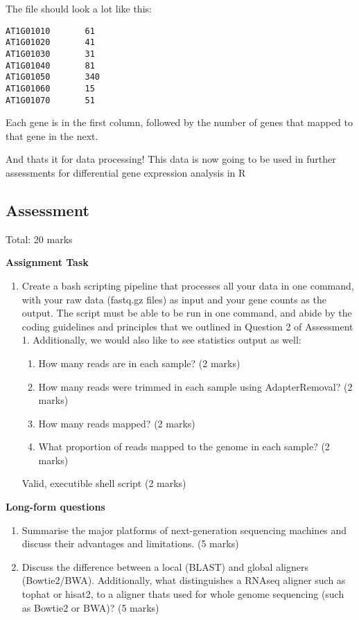 The file should look a lot like this:

\begin{verbatim}
AT1G01010       61
AT1G01020       41
AT1G01030       31
AT1G01040       81
AT1G01050       340
AT1G01060       15
AT1G01070       51
\end{verbatim}

Each gene is in the first column, followed by the number of genes that
mapped to that gene in the next.

And thats it for data processing! This data is now going to be used in
further assessments for differential gene expression analysis in R

\subsection{Assessment}\label{assessment}

Total: 20 marks

\textbf{Assignment Task}

\begin{enumerate}
\def\labelenumi{\arabic{enumi}.}
\item
  Create a bash scripting pipeline that processes all your data in one
  command, with your raw data (fastq.gz files) as input and your gene
  counts as the output. The script must be able to be run in one
  command, and abide by the coding guidelines and principles that we
  outlined in Question 2 of Assessment 1. Additionally, we would also
  like to see statistics output as well:

  \begin{enumerate}
  \def\labelenumii{(\Alph{enumii})}
  \tightlist
  \item
    How many reads are in each sample? (2 marks)\\
  \item
    How many reads were trimmed in each sample using AdapterRemoval? (2
    marks)\\
  \item
    How many reads mapped? (2 marks)\\
  \item
    What proportion of reads mapped to the genome in each sample? (2
    marks)
  \end{enumerate}

  Valid, executible shell script (2 marks)
\end{enumerate}

\textbf{Long-form questions}

\begin{enumerate}
\def\labelenumi{\arabic{enumi}.}
\setcounter{enumi}{1}
\item
  Summarise the major platforms of next-generation sequencing machines
  and discuss their advantages and limitations. (5 marks)
\item
  Discuss the difference between a local (BLAST) and global aligners
  (Bowtie2/BWA). Additionally, what distinguishes a RNAseq aligner such
  as tophat or hisat2, to a aligner thats used for whole genome
  sequencing (such as Bowtie2 or BWA)? (5 marks)
\end{enumerate}
